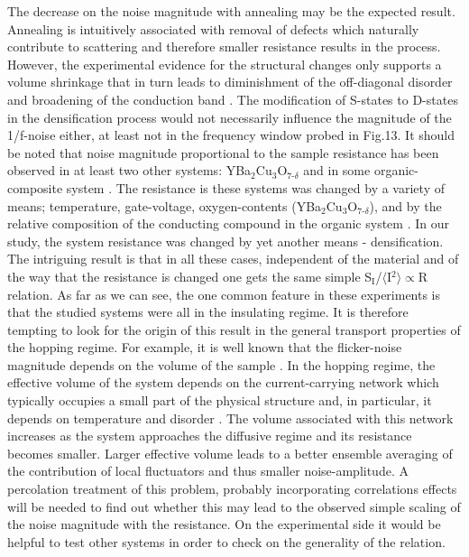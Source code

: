 \documentclass
[preprint,showpacs,byrevtex,10pt,twocolumn,tightenlines,prl,letterpaper]{revtex4}%
\begin{document}
The decrease on the noise magnitude with annealing may be the expected result.
Annealing is intuitively associated with removal of defects which naturally
contribute to scattering and therefore smaller resistance results in the
process. However, the experimental evidence for the structural changes only
supports a volume shrinkage that in turn leads to diminishment of the
off-diagonal disorder and broadening of the conduction band \cite{14}. The
modification of S-states to D-states in the densification process would not
necessarily influence the magnitude of the 1/f-noise either, at least not in
the frequency window probed in Fig.13. It should be noted that noise magnitude
proportional to the sample resistance has been observed in at least two other
systems: YBa$_{\text{2}}$Cu$_{\text{3}}$O$_{\text{7-}\delta}$ \cite{31} and in
some organic-composite system \cite{33}. The resistance is these systems was
changed by a variety of means; temperature, gate-voltage, oxygen-contents
(YBa$_{\text{2}}$Cu$_{\text{3}}$O$_{\text{7-}\delta}$), and by the relative
composition of the conducting compound in the organic system \cite{33}. In our
study, the system resistance was changed by yet another means - densification.
The intriguing result is that in all these cases, independent of the material
and of the way that the resistance is changed one gets the same simple
S$_{\text{I}}$/$\langle$I$^{\text{2}}\rangle\propto$R relation. As far as we
can see, the one common feature in these experiments is that the studied
systems were all in the insulating regime. It is therefore tempting to look
for the origin of this result in the general transport properties of the
hopping regime. For example, it is well known that the flicker-noise magnitude
depends on the volume of the sample \cite{27,28}. In the hopping regime, the
effective volume of the system depends on the current-carrying network which
typically occupies a small part of the physical structure and, in particular,
it depends on temperature and disorder \cite{34}. The volume associated with
this network increases as the system approaches the diffusive regime and its
resistance becomes smaller. Larger effective volume leads to a better ensemble
averaging of the contribution of local fluctuators and thus smaller
noise-amplitude. A percolation treatment of this problem, probably
incorporating correlations effects \cite{35} will be needed to find out
whether this may lead to the observed simple scaling of the noise magnitude
with the resistance. On the experimental side it would be helpful to test
other systems in order to check on the generality of the relation.
\end{document}
